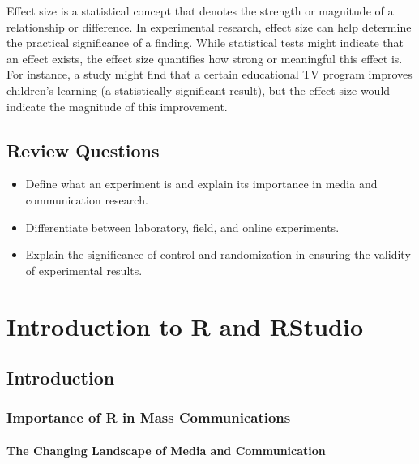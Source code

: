 \documentclass[
  b5paper]{book}
\begin{document}
Effect size is a statistical concept that denotes the strength or magnitude of a relationship or difference. In experimental research, effect size can help determine the practical significance of a finding. While statistical tests might indicate that an effect exists, the effect size quantifies how strong or meaningful this effect is. For instance, a study might find that a certain educational TV program improves children's learning (a statistically significant result), but the effect size would indicate the magnitude of this improvement.

\hypertarget{review-questions}{%
\section{Review Questions}\label{review-questions}}

\begin{itemize}
\item
  Define what an experiment is and explain its importance in media and communication research.
\item
  Differentiate between laboratory, field, and online experiments.
\item
  Explain the significance of control and randomization in ensuring the validity of experimental results.
\end{itemize}

\hypertarget{introduction-to-r-and-rstudio}{%
\chapter{Introduction to R and RStudio}\label{introduction-to-r-and-rstudio}}

\hypertarget{introduction-5}{%
\section{Introduction}\label{introduction-5}}

\hypertarget{importance-of-r-in-mass-communications}{%
\subsection*{Importance of R in Mass Communications}\label{importance-of-r-in-mass-communications}}

\hypertarget{the-changing-landscape-of-media-and-communication}{%
\subsubsection*{The Changing Landscape of Media and Communication}\label{the-changing-landscape-of-media-and-communication}}
\end{document}

